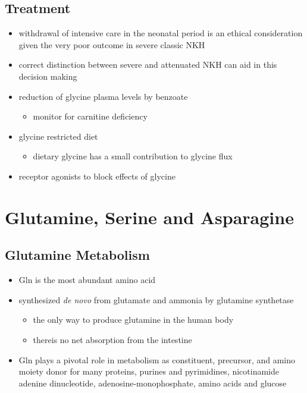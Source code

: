 \documentclass{scrartcl}
\begin{document}
\subsection{Treatment}
\label{sec:org7a14b62}
\begin{itemize}
\item withdrawal of intensive care in the neonatal period is an ethical
consideration given the very poor outcome in severe classic NKH
\item correct distinction between severe and attenuated NKH can aid in
this decision making
\item reduction of glycine plasma levels by benzoate
\begin{itemize}
\item monitor for carnitine deficiency
\end{itemize}
\item glycine restricted diet
\begin{itemize}
\item dietary glycine has a small contribution to glycine flux
\end{itemize}
\item receptor agonists to block effects of glycine
\end{itemize}

\section{Glutamine, Serine and Asparagine}
\label{sec:org3cddd4c}
\subsection{Glutamine Metabolism}
\label{sec:orgd697ad1}
\begin{itemize}
\item Gln is the most abundant amino acid
\item synthesized \emph{de novo} from glutamate and ammonia by glutamine synthetase
\begin{itemize}
\item the only way to produce glutamine in the human body
\item thereis no net absorption from the intestine
\end{itemize}
\item Gln plays a pivotal role in metabolism as constituent, precursor,
and amino moiety donor for many proteins, purines and pyrimidines,
nicotinamide adenine dinucleotide, adenosine-monophosphate, amino
acids and glucose
\end{itemize}
\end{document}
